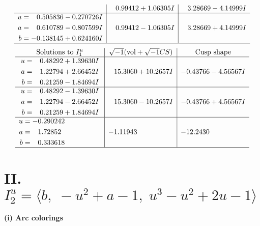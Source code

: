 \documentclass[1p]{elsarticle_modified}
\theoremstyle{definition}
\newcommand{\I}{\sqrt{-1}}
\begin{document}
$$\begin{array}{c|c|c}
 & \phantom{-}0.99412 + 1.06305 I & \phantom{-}3.28669 - 4.14999 I \\ \hline\begin{aligned}
u &= \phantom{-}0.505836 - 0.270726 I \\
a &= \phantom{-}0.610789 - 0.807599 I \\
b &= -0.138145 + 0.624160 I\end{aligned}
 & \phantom{-}0.99412 - 1.06305 I & \phantom{-}3.28669 + 4.14999 I\\
 \hline 
 \end{array}$$\newpage$$\begin{array}{c|c|c}  
\text{Solutions to }I^u_{1}& \I (\text{vol} + \sqrt{-1}CS) & \text{Cusp shape}\\
 \hline 
\begin{aligned}
u &= \phantom{-}0.48292 + 1.39630 I \\
a &= \phantom{-}1.22794 + 2.66452 I \\
b &= \phantom{-}0.21259 - 1.84694 I\end{aligned}
 & \phantom{-}15.3060 + 10.2657 I & -0.43766 - 4.56567 I \\ \hline\begin{aligned}
u &= \phantom{-}0.48292 - 1.39630 I \\
a &= \phantom{-}1.22794 - 2.66452 I \\
b &= \phantom{-}0.21259 + 1.84694 I\end{aligned}
 & \phantom{-}15.3060 - 10.2657 I & -0.43766 + 4.56567 I \\ \hline\begin{aligned}
u &= -0.290242\phantom{ +0.000000I} \\
a &= \phantom{-}1.72852\phantom{ +0.000000I} \\
b &= \phantom{-}0.333618\phantom{ +0.000000I}\end{aligned}
 & -1.11943\phantom{ +0.000000I} & -12.2430\phantom{ +0.000000I}\\
 \hline 
 \end{array}$$\newpage\newpage\renewcommand{\arraystretch}{1}
\centering \section*{II. $I^u_{2}= \langle b,\;- u^2+a-1,\;u^3- u^2+2 u-1 \rangle$}
\flushleft \textbf{(i) Arc colorings}\\
\end{document}
